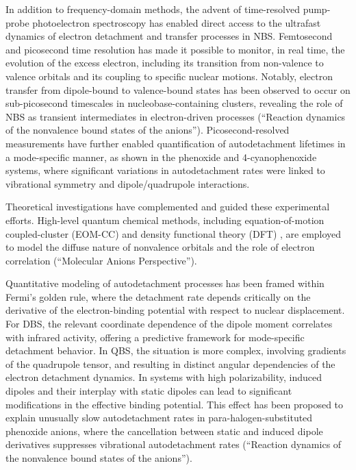 In addition to frequency-domain methods, the advent of time-resolved pump-probe photoelectron spectroscopy has enabled direct access to the ultrafast dynamics of electron detachment and transfer processes in NBS. Femtosecond and picosecond time resolution has made it possible to monitor, in real time, the evolution of the excess electron, including its transition from non-valence to valence orbitals and its coupling to specific nuclear motions. Notably, electron transfer from dipole-bound to valence-bound states has been observed to occur on sub-picosecond timescales in nucleobase-containing clusters, revealing the role of NBS as transient intermediates in electron-driven processes (“Reaction dynamics of the nonvalence bound states of the anions”). Picosecond-resolved measurements have further enabled quantification of autodetachment lifetimes in a mode-specific manner, as shown in the phenoxide and 4-cyanophenoxide systems, where significant variations in autodetachment rates were linked to vibrational symmetry and dipole/quadrupole interactions.

Theoretical investigations have complemented and guided these experimental efforts. High-level quantum chemical methods, including equation-of-motion coupled-cluster (EOM-CC) \cite{jordan2003theory,paran2024performance} and density functional theory (DFT) \cite{thiam2023accurately}, are employed to model the diffuse nature of nonvalence orbitals and the role of electron correlation (“Molecular Anions Perspective”).

Quantitative modeling of autodetachment processes has been framed within Fermi's golden rule, where the detachment rate depends critically on the derivative of the electron-binding potential with respect to nuclear displacement. For DBS, the relevant coordinate dependence of the dipole moment correlates with infrared activity, offering a predictive framework for mode-specific detachment behavior. In QBS, the situation is more complex, involving gradients of the quadrupole tensor, and resulting in distinct angular dependencies of the electron detachment dynamics. In systems with high polarizability, induced dipoles and their interplay with static dipoles can lead to significant modifications in the effective binding potential. This effect has been proposed to explain unusually slow autodetachment rates in para-halogen-substituted phenoxide anions, where the cancellation between static and induced dipole derivatives suppresses vibrational autodetachment rates (“Reaction dynamics of the nonvalence bound states of the anions”).

